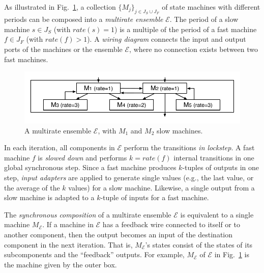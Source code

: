 As illustrated in Fig.~\ref{fig:ensemble},
a collection $\{M_j\}_{j\in J_S\cup J_F}$ of  state machines with different periods 
can be composed into a 
\emph{multirate ensemble} $\mathcal{E}$.
The period of a slow machine $s \in J_S$ (with $\mathit{rate}(s) = 1$) is 
a multiple of the period of a fast machine $f \in J_F$ (with $\mathit{rate}(f) > 1$). 
A \emph{wiring diagram} connects  the input and output ports of the machines or the ensemble $\mathcal{E}$, %
where no connection exists between two fast machines.

\begin{figure}
\centering
\includegraphics[clip=true,trim=0.3cm 0.4cm 0.3cm 0.4cm,width=\columnwidth]{ensemble.pdf}    
\caption{A multirate ensemble $\mathcal{E}$,
with $M_1$ and $M_2$ slow machines.
}  \label{fig:ensemble}
\end{figure}

In each iteration, all components in $\mathcal{E}$ perform the transitions \emph{in lockstep}.
A fast machine $f$ is \emph{slowed down} 
and performs $k = \mathit{rate}(f)$ internal transitions  in one global synchronous step.
Since 
a fast machine produces $k$-tuples of outputs in one step, 
\emph{input adapters} are applied 
to generate single values (e.g., the last value, or 
the average of the $k$ values) for a slow machine. 
Likewise, a single output  from a slow machine is adapted to a $k$-tuple of inputs 
for a fast machine.




The \emph{synchronous composition}  of a multirate ensemble $\mathcal{E}$
is equivalent to a single machine $M_\mathcal{E}$.
If a machine in $\mathcal{E}$ has a feedback wire connected to itself or to another component, then the output becomes an input of the destination component in the next iteration.
That is,  $M_\mathcal{E}$'s states %
consist of the states %
of its subcomponents %
and
the   ``feedback'' outputs. %
For example, 
$M_\mathcal{E}$ of 
$\mathcal{E}$ in Fig.~\ref{fig:ensemble} 
is the machine given by the outer box. 


